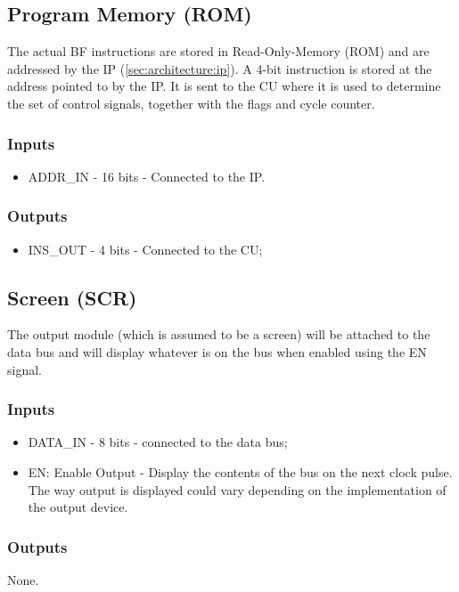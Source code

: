 \subsection{Program Memory (ROM)} \label{sec:architecture:rom}
The actual BF instructions are stored in Read-Only-Memory (ROM) and are addressed by the IP (\ref{sec:architecture:ip}). A 4-bit instruction is stored at the address pointed to by the IP. It is sent to the CU where it is used to determine the set of control signals, together with the flags and cycle counter.

\subsubsection*{Inputs}
\begin{itemize}
\itemsep0em 
\item ADDR\_IN - 16 bits - Connected to the IP.
\end{itemize}

\subsubsection*{Outputs}
\begin{itemize}
\itemsep0em 
\item INS\_OUT - 4 bits - Connected to the CU;
\end{itemize}


\subsection{Screen (SCR)}  \label{sec:architecture:scr}
The output module (which is assumed to be a screen) will be attached to the data bus and will display whatever is on the bus  when enabled using the EN signal.
\subsubsection*{Inputs}
\begin{itemize}
\itemsep0em 
\item DATA\_IN - 8 bits - connected to the data bus;
\item EN: Enable Output - Display the contents of the bus on the next clock pulse. The way output is displayed could vary depending on the implementation of the output device.
\end{itemize}

\subsubsection*{Outputs}
None.


